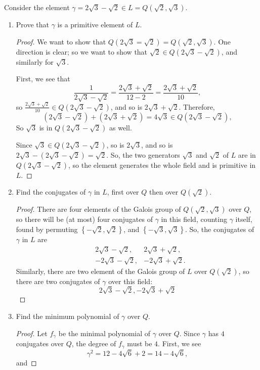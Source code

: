 \documentclass[12pt]{article}
\theoremstyle{definition}
\newenvironment{problem}[2][Problem]{\begin{trivlist}
\item[\hskip \labelsep {\bfseries #1}\hskip \labelsep {\bfseries #2.}]}{\end{trivlist}}
\begin{document}
\begin{problem}{5}
	Consider the element $\gamma = 2\sqrt 3 - \sqrt 2 \in L = Q(\sqrt 2, \sqrt 3)$.
	\begin{enumerate}[label=(\alph*)]
		\item Prove that $\gamma$ is a primitive element of $L$.
			\begin{proof}
				We want to show that $Q(2 \sqrt 3 = \sqrt 2) = Q(\sqrt 2, \sqrt 3)$. One direction is clear; so we want to show that $\sqrt 2 \in Q(2 \sqrt 3 - \sqrt 2)$, and similarly for $\sqrt 3$.
				\par First, we see that 
				\[\frac{1}{2 \sqrt 3 - \sqrt 2} = \frac{2 \sqrt 3 + \sqrt 2}{12 - 2} = \frac{2 \sqrt 3 + \sqrt 2}{10},\]
				so $\frac{2 \sqrt 3 + \sqrt 2}{10} \in Q(2 \sqrt 3 - \sqrt 2)$, and so is $2 \sqrt 3 + \sqrt 2$. Therefore,
				\[(2 \sqrt 3 - \sqrt 2) + (2 \sqrt 3 + \sqrt 2) = 4 \sqrt 3 \in Q(2 \sqrt 3 - \sqrt 2),\]
				So $\sqrt 3$ is in $Q(2 \sqrt 3 - \sqrt 2)$ as well. 
				\par Since $\sqrt 3 \in Q(2 \sqrt 3 - \sqrt 2)$, so is $2 \sqrt 3$, and so is $2 \sqrt 3 - (2 \sqrt 3 - \sqrt 2) = \sqrt 2$. So, the two generators $\sqrt 3$ and $\sqrt 2$ of $L$ are in $Q(2 \sqrt 3 - \sqrt 2)$, so the element generates the whole field and is primitive in $L$.
			\end{proof}
		\item Find the conjugates of $\gamma$ in $L$, first over $Q$ then over $Q(\sqrt 2)$.
			\begin{proof}
				There are four elements of the Galois group of $Q(\sqrt 2, \sqrt 3)$ over $Q$, so there will be (at most) four conjugates of $\gamma$ in this field, counting $\gamma$ itself, found by permuting $\left\{ -\sqrt 2, \sqrt 2 \right\}$, and $\left\{ - \sqrt 3, \sqrt 3 \right\}$. So, the conjugates of $\gamma$ in $L$ are
				\begin{align*}
					&2 \sqrt 3 - \sqrt 2, & 2 \sqrt 3 + \sqrt 2,\\
					&-2 \sqrt 3 - \sqrt 2, &-2 \sqrt 3 + \sqrt 2.
				\end{align*}
				Similarly, there are two element of the Galois group of $L$ over $Q(\sqrt 2)$, so there are two conjugates of $\gamma$ over this field:
				\[2 \sqrt 3 - \sqrt 2, -2 \sqrt 3 + \sqrt 2\]
			\end{proof}
		\item Find the minimum polynomial of $\gamma$ over $Q$.
			\begin{proof}
				Let $f_\gamma$ be the minimal polynomial of $\gamma$ over $Q$. Since $\gamma$ has $4$ conjugates over $Q$, the degree of $f_\gamma$ must be $4$. First, we see \[\gamma^2 = 12 - 4\sqrt 6 + 2 = 14 - 4 \sqrt 6,\] and

\end{proof}
\end{enumerate}
\end{problem}
\end{document}
